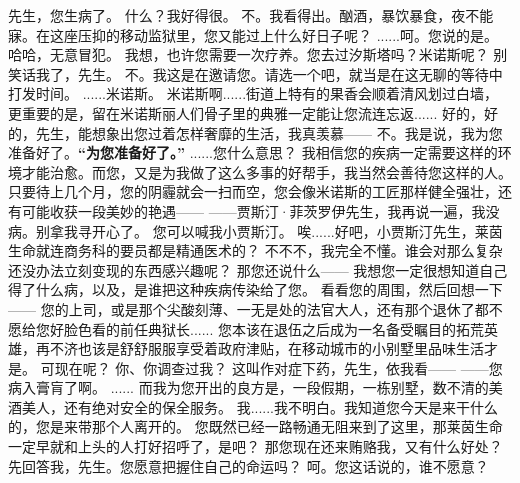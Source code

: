 \documentclass[openany]{book}
\begin{document}
\begin{dialogue}
     先生，您生病了。
     什么？我好得很。
     不。我看得出。酗酒，暴饮暴食，夜不能寐。在这座压抑的移动监狱里，您又能过上什么好日子呢？
     ......呵。您说的是。
     哈哈，无意冒犯。
     我想，也许您需要一次疗养。您去过汐斯塔吗？米诺斯呢？
     别笑话我了，先生。
     不。我这是在邀请您。请选一个吧，就当是在这无聊的等待中打发时间。
     ......米诺斯。
     米诺斯啊......街道上特有的果香会顺着清风划过白墙，更重要的是，留在米诺斯丽人们骨子里的典雅一定能让您流连忘返......
     好的，好的，先生，能想象出您过着怎样奢靡的生活，我真羡慕——
     不。我是说，我为您准备好了。\textbf{“为您准备好了。”}
     ......您什么意思？
     我相信您的疾病一定需要这样的环境才能治愈。而您，又是为我做了这么多事的好帮手，我当然会善待您这样的人。
     只要待上几个月，您的阴霾就会一扫而空，您会像米诺斯的工匠那样健全强壮，还有可能收获一段美妙的艳遇——
     ——贾斯汀·菲茨罗伊先生，我再说一遍，我没病。别拿我寻开心了。
     您可以喊我小贾斯汀。
     唉......好吧，小贾斯汀先生，莱茵生命就连商务科的要员都是精通医术的？
     不不不，我完全不懂。谁会对那么复杂还没办法立刻变现的东西感兴趣呢？
     那您还说什么——
     我想您一定很想知道自己得了什么病，以及，是谁把这种疾病传染给了您。
     看看您的周围，然后回想一下——
     您的上司，或是那个尖酸刻薄、一无是处的法官大人，还有那个退休了都不愿给您好脸色看的前任典狱长......
     您本该在退伍之后成为一名备受瞩目的拓荒英雄，再不济也该是舒舒服服享受着政府津贴，在移动城市的小别墅里品味生活才是。
     可现在呢？
     你、你调查过我？
     这叫作对症下药，先生，依我看——
     ——您病入膏肓了啊。
     ......
     而我为您开出的良方是，一段假期，一栋别墅，数不清的美酒美人，还有绝对安全的保全服务。
     我......我不明白。我知道您今天是来干什么的，您是来带那个人离开的。
     您既然已经一路畅通无阻来到了这里，那莱茵生命一定早就和上头的人打好招呼了，是吧？
     那您现在还来贿赂我，又有什么好处？
     先回答我，先生。您愿意把握住自己的命运吗？
     呵。您这话说的，谁不愿意？

\end{dialogue}
\end{document}
